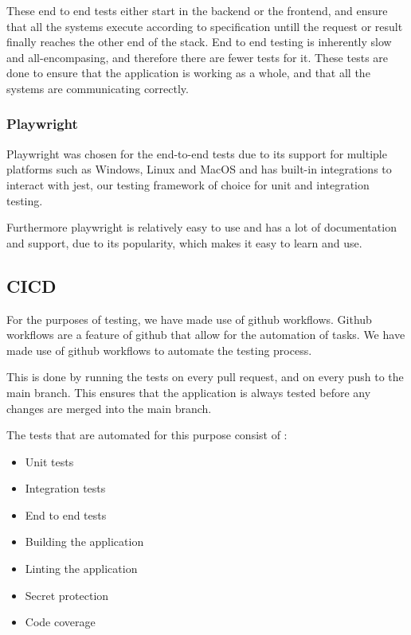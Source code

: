 \documentclass[11pt,a4paper]{article}
\begin{document}
These end to end tests either start in the backend or the frontend, and ensure
that all the systems execute according to specification untill the request or
result finally reaches the other end of the stack. End to end testing is
inherently slow and all-encompasing, and therefore there are fewer tests for it.
These tests are done to ensure that the application is working as a whole, and
that all the systems are communicating correctly.


\subsubsection*{Playwright}

Playwright was chosen for the end-to-end tests due to its support for multiple
platforms such as Windows, Linux and MacOS and has built-in integrations to
interact with jest, our testing framework of choice for unit and integration
testing. 

Furthermore playwright is relatively easy to use and has a lot of documentation
and support, due to its popularity, which makes it easy to learn and use.

\subsection*{CICD}

For the purposes of testing, we have made use of github workflows. Github
workflows are a feature of github that allow for the automation of tasks. We
have made use of github workflows to automate the testing process. 

This is done by running the tests on every pull request, and on every push to
the main branch. This ensures that the application is always tested before any
changes are merged into the main branch.

The tests that are automated for this purpose consist of : 
\begin{itemize}
  \item Unit tests
  \item Integration tests
  \item End to end tests
  \item Building the application
  \item Linting the application
  \item Secret protection
  \item Code coverage
\end{itemize}
\end{document}
